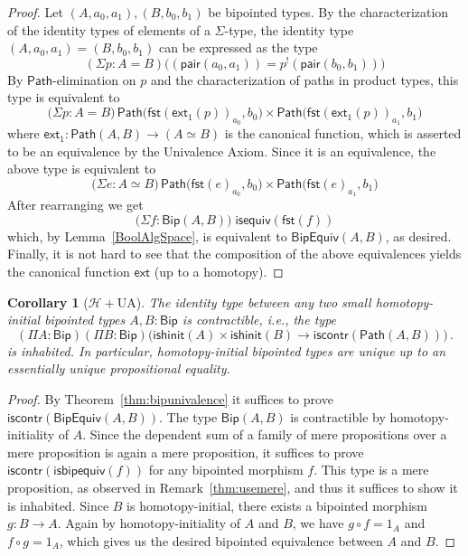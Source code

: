 \documentclass[10pt,a4paper,oneside,reqno]{amsart}
\numberwithin{equation}{section}
\theoremstyle{mythm}
\newtheorem{corollary}[theorem]{Corollary}
\theoremstyle{mydef}
\theoremstyle{myrmk}
\newcommand{\co}{\colon}
\newcommand{\comp}{\circ}
\newcommand{\Hint}{\mathcal{H}}
\newcommand{\iscontr}{\mathsf{iscontr}}
\newcommand{\isequiv}{\mathsf{isequiv}}
\newcommand{\ext}{\mathsf{ext}}
\newcommand{\pair}{\mathsf{pair}}
\newcommand{\fst}{\mathsf{fst}}
\newcommand{\Id}{\mathsf{Path}}
\newcommand{\Bip}{\mathsf{Bip}}
\newcommand{\BipHom}{\mathsf{Bip}}
\newcommand{\isbipequiv}{\mathsf{isbipequiv}}
\newcommand{\BipEquiv}{\mathsf{BipEquiv}}
\newcommand{\ishinitial}{\mathsf{ishinit}}
\begin{document}
\begin{proof} 
Let $ (A,a_0,a_1), (B,b_0,b_1)$ be bipointed types. By the characterization of the identity types
of  elements of a $\Sigma$-type, the 
identity type $(A,a_0,a_1) = (B,b_0,b_1)$ can be expressed as the type
\[(\Sigma p : A = B) \big((\pair(a_0,a_1)) = p^{!}(\pair(b_0,b_1)) \big)\]
By $\Id$-elimination on $p$ and the characterization of paths in product types, this type is equivalent to
\[ \big(\Sigma p : A = B \big) \, \Id \big(\fst(\ext_1(p))_{a_0},  b_0\big) \times \Id \big( \fst(\ext_1(p))_{a_1} , b_1\big) \]
where $\ext_1 \co \Id(A,B) \to (A \simeq B)$ is the canonical function, which is asserted to be an equivalence by the
Univalence Axiom. Since it is an equivalence, the above type is equivalent to
\[ \big(\Sigma e : A \simeq B \big) \, \Id \big(\fst(e)_{a_0},  b_0\big) \times \Id \big( \fst(e)_{a_1} , b_1\big) \]
After rearranging we get
\[
 \big(\Sigma f \co \BipHom(A,B)\big) \; \isequiv(\fst(f))
\]
which, by Lemma~\ref{BoolAlgSpace}, is equivalent to $\BipEquiv(A,B)$, as desired. Finally, it is not hard to see that the composition of the above equivalences yields the canonical function $\ext$ (up to a homotopy).
\end{proof} 

\begin{corollary}[$\Hint + \mathrm{UA}$] \label{BoolHInitIso}
The identity type between any two small homotopy-initial bipointed types $A,B : \Bip$ is contractible, i.e., the type
\[ 
(\Pi A \co \Bip)(\Pi B \co \Bip) 
\big( \ishinitial(A) \times \ishinitial(B) \to \iscontr(\Id(A,B)) \big) \, .
\] 
is inhabited. In particular, homotopy-initial bipointed types are unique up to an essentially unique
propositional equality.
\end{corollary}

\begin{proof}
By Theorem~\ref{thm:bipunivalence} it suffices to prove $\iscontr(\BipEquiv(A,B))$. The type 
$\BipHom( A, B)$ is contractible by homotopy-initiality of $A$. Since the dependent sum of a family of mere propositions over a mere proposition is again a mere proposition, it suffices to prove $\iscontr(\isbipequiv(f))$ for any bipointed morphism $f$. This type is a mere proposition, as observed in Remark~\ref{thm:usemere}, and thus it suffices to show it is inhabited.
Since $B$ is homotopy-initial, there exists a bipointed morphism $g : B \to A$. Again by homotopy-initiality of $A$ and $B$, we have $g \comp f = 1_A$ and~$f \comp g = 1_A$, which gives us the desired bipointed equivalence between $A$ and $B$.
\end{proof}
\end{document}
